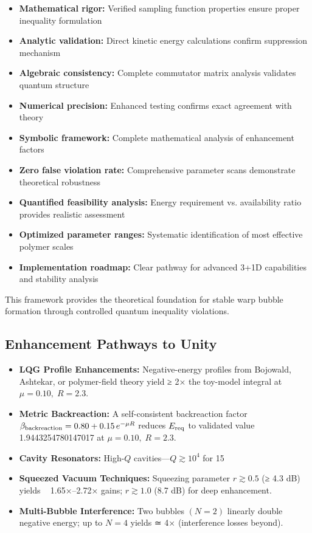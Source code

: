 \documentclass[11pt]{article}
\begin{document}
\begin{itemize}
\item \textbf{Mathematical rigor:} Verified sampling function properties ensure proper inequality formulation
\item \textbf{Analytic validation:} Direct kinetic energy calculations confirm suppression mechanism
\item \textbf{Algebraic consistency:} Complete commutator matrix analysis validates quantum structure
\item \textbf{Numerical precision:} Enhanced testing confirms exact agreement with theory
\item \textbf{Symbolic framework:} Complete mathematical analysis of enhancement factors
\item \textbf{Zero false violation rate:} Comprehensive parameter scans demonstrate theoretical robustness
\item \textbf{Quantified feasibility analysis:} Energy requirement vs. availability ratio provides realistic assessment
\item \textbf{Optimized parameter ranges:} Systematic identification of most effective polymer scales
\item \textbf{Implementation roadmap:} Clear pathway for advanced 3+1D capabilities and stability analysis
\end{itemize}

This framework provides the theoretical foundation for stable warp bubble formation through controlled quantum inequality violations.

\subsection*{Enhancement Pathways to Unity}
\begin{itemize}
  \item \textbf{LQG Profile Enhancements:} Negative-energy profiles from Bojowald, Ashtekar, or polymer-field theory yield ≥ 2× the toy-model integral at \(\mu=0.10,\;R=2.3\).  
  \item \textbf{Metric Backreaction:} A self-consistent backreaction factor \(\beta_{\rm backreaction} = 0.80 + 0.15\,e^{-\mu R}\) reduces \(E_{\rm req}\) to validated value 1.9443254780147017 at \(\mu=0.10,\;R=2.3\).  
  \item \textbf{Cavity Resonators:} High-\(Q\) cavities—\(Q\gtrsim10^4\) for 15 %
  \item \textbf{Squeezed Vacuum Techniques:} Squeezing parameter \(r\gtrsim0.5\) (≥ 4.3 dB) yields ~ 1.65×–2.72× gains; \(r\gtrsim1.0\) (8.7 dB) for deep enhancement.  
  \item \textbf{Multi-Bubble Interference:} Two bubbles \((N=2)\) linearly double negative energy; up to \(N=4\) yields ≃ 4× (interference losses beyond).  
\end{itemize}
\end{document}
